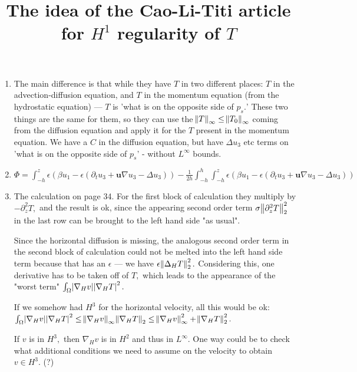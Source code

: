 \documentclass[11pt]{article}
\title{The idea of the Cao-Li-Titi article for $H^1$ regularity of $T$}
\begin{document}
\maketitle

\begin{enumerate}

\item The main difference is that while they have $T$ in two different places: $T$ in the advection-diffusion equation, and $T$ in the momentum equation (from the hydrostatic equation) --- $T$ is 'what is on the opposite side of $p_s.$' These two things are the same for them, so they can use the $\norm{T}_\infty \leq \norm{T_0}_\infty$ coming from the diffusion equation and apply it for the $T$ present in the momentum equation. We have a $C$ in the diffusion equation, but have $\Delta u_3$ etc terms on 'what is on the opposite side of $p_s$' - without $L^\infty$ bounds.

\item

$\Phi = \int_{-h}^z \epsilon (\beta u_1 - \epsilon (\partial_t u_3 + \mathbf{u} \nabla u_3 - \Delta u_3)) - \frac{1}{2h} \int_{-h}^h \int_{-h}^z \epsilon (\beta u_1 - \epsilon (\partial_t u_3 + \mathbf{u} \nabla u_3 - \Delta u_3))$

\item The calculation on page 34. For the first block of calculation they multiply by $-\partial^2_z T,$ and the result is ok, since the appearing second order term $\sigma \norm{\partial^2_z T}_2^2$ in the last row can be brought to the left hand side "as usual".

Since the horizontal diffusion is missing, the analogous second order term in the second block of calculation could not be melted into the left hand side term because that has an $\epsilon$ --- we have $\epsilon \norm{\Delta_H T}_2^2.$ Considering this, one derivative has to be taken off of $T,$ which leads to the appearance of the "worst term" $\int_\Omega \abs{\nabla _H v} \abs{\nabla_H T}^2.$

\textcolor{ao}{If we somehow had $H^3$ for the horizontal velocity, all this would be ok:} $\int_\Omega \abs{\nabla _H v} \abs{\nabla_H T}^2 \leq \norm{\nabla _H v}_\infty \norm{\nabla_H T}_2 \leq \norm{\nabla _H v}_\infty^2 + \norm{\nabla_H T}_2^2.$

If $v$ is in $H^3,$ then $\nabla_H v$ is in $H^2$ and thus in $L^\infty.$ One way could be to check what additional conditions we need to assume on the velocity to obtain $v \in H^3.$ (?)


\end{enumerate}
\end{document}
